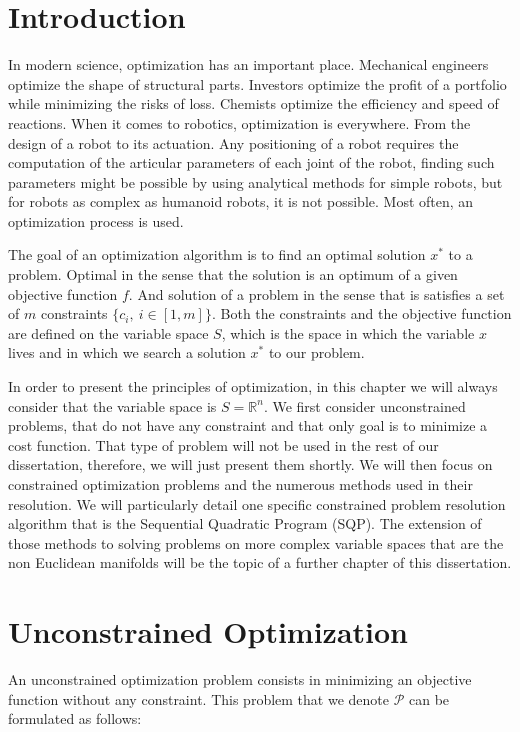 \section{Introduction}
In modern science, optimization has an important place.
Mechanical engineers optimize the shape of structural parts.
Investors optimize the profit of a portfolio while minimizing the risks of loss.
Chemists optimize the efficiency and speed of reactions.
When it comes to robotics, optimization is everywhere.
From the design of a robot to its actuation.
Any positioning of a robot requires the computation of the articular parameters of each joint of the robot, finding such parameters might be possible by using analytical methods for simple robots, but for robots as complex as humanoid robots, it is not possible.
Most often, an optimization process is used.

The goal of an optimization algorithm is to find an optimal solution $x^*$ to a problem.
Optimal in the sense that the solution is an optimum of a given objective function $f$.
And solution of a problem in the sense that is satisfies a set of $m$ constraints $\{c_i,\ i\in [1,m]\}$.
Both the constraints and the objective function are defined on the variable space $\mathit{S}$, which is the space in which the variable $x$ lives and in which we search a solution $x^*$ to our problem.

In order to present the principles of optimization, in this chapter we will always consider that the variable space is $\mathit{S}=\mathbb{R}^n$.
We first consider unconstrained problems, that do not have any constraint and that only goal is to minimize a cost function.
That type of problem will not be used in the rest of our dissertation, therefore, we will just present them shortly.
We will then focus on constrained optimization problems and the numerous methods used in their resolution.
We will particularly detail one specific constrained problem resolution algorithm that is the Sequential Quadratic Program (SQP).
The extension of those methods to solving problems on more complex variable spaces that are the non Euclidean manifolds will be the topic of a further chapter of this dissertation.

\section{Unconstrained Optimization}

An unconstrained optimization problem consists in minimizing an objective function without any constraint.
This problem that we denote $\mathcal{P}$ can be formulated as follows:

